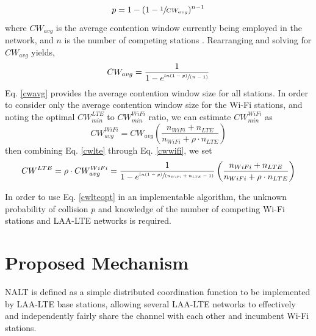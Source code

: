 \begin{equation}\label{pcollision}
p = 1-(1-\sfrac{1}{CW_{avg}})^{n-1}
\end{equation}
where $CW_{avg}$ is the average contention window currently being employed in the network, and $n$ is the number of competing stations \cite{vu}.  Rearranging and solving for $CW_{avg}$ yields,
\begin{equation}\label{cwavg}
CW_{avg} = \frac{1}{1-e^{ \sfrac{ln(1-p)}{(n-1)} }}
\end{equation}
Eq. \ref{cwavg} provides the average contention window size for all stations.  In order to consider only the average contention window size for the \mbox{Wi-Fi} stations, and noting the optimal $CW^{LTE}_{min}$ to $CW^{WiFi}_{min}$ ratio, we can estimate $CW^{WiFi}_{min}$ as
\begin{equation}\label{cwwifi}
CW^{WiFi}_{avg} = CW_{avg}\left ( \frac{n_{WiFi} + n_{LTE}}{n_{WiFi} + \rho\cdot n_{LTE}} \right )
\end{equation}
then combining Eq. \ref{cwlte} through Eq. \ref{cwwifi},  we set 
\begin{equation}\label{cwlteopt}
CW^{LTE} = \rho \cdot{CW^{WiFi}_{avg}} = \frac{1}{1-e^{ \sfrac{ln(1-p)}{(n_{WiFi} + n_{LTE}-1)} }}\left ( \frac{n_{WiFi} + n_{LTE}}{n_{WiFi} + \rho\cdot n_{LTE}} \right )
\end{equation}

In order to use Eq. \ref{cwlteopt} in an implementable algorithm, the unknown probability of collision  $p$ and knowledge of the number of competing Wi-Fi stations and LAA-LTE networks is required.

\section{Proposed Mechanism}
\label{proposed}
NALT is defined as a simple distributed coordination function to be implemented by LAA-LTE base stations, allowing several LAA-LTE networks to effectively and independently fairly share the channel with each other and incumbent Wi-Fi stations. 

